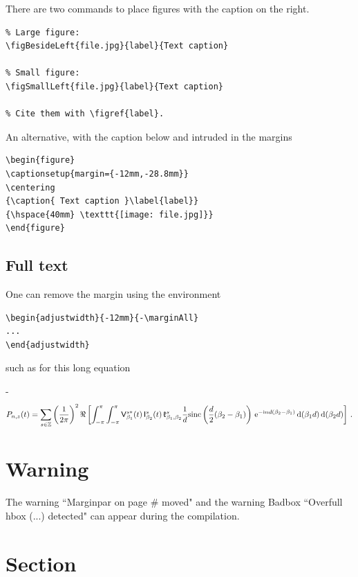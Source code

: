 There are two commands to place figures with the caption on the right.
\begin{verbatim}
% Large figure:
\figBesideLeft{file.jpg}{label}{Text caption}

% Small figure:
\figSmallLeft{file.jpg}{label}{Text caption}

% Cite them with \figref{label}.
\end{verbatim}
An alternative, with the caption below and intruded in the margins
\begin{verbatim}
\begin{figure}
\captionsetup{margin={-12mm,-28.8mm}}
\centering
{\caption{ Text caption }\label{label}}
{\hspace{40mm} \texttt{[image: file.jpg]}}
\end{figure}
\end{verbatim}

\subsection{Full text}

One can remove the margin using the environment
\begin{verbatim}
\begin{adjustwidth}{-12mm}{-\marginAll}
...
\end{adjustwidth}
\end{verbatim}
such as for this long equation
\begin{adjustwidth}{-12mm}{-\marginAll}
 \begin{equation}
  P_{n,z} (t) 
 = \sum_{s \in {\mathbb Z}} \left( \frac{1}{2 \pi}\right)^2 \Re \left[ \int_{- \pi}^\pi  \int_{- \pi}^\pi  {\mathsf V}^{s*}_{\beta_1}(t) \, {\mathsf I}^{s}_{\beta_2}(t) \, \mathfrak{k}^s_{\beta_1, \beta_2}   \frac{1}{d} \mathrm{sinc}\left( \frac{d}{2} ( \beta_2 - \beta_1 )\right) \, {\mathrm e}^{-{\mathrm i} n d( \beta_2 - \beta_1 )} \,  {\mathrm d} (\beta_1 d) \, {\mathrm d} (\beta_2 d) \right]  \, .
  \label{e.PnKinbeta}
\end{equation}
\end{adjustwidth}


\section{Warning}

The warning ``Marginpar on page \# moved" and the warning Badbox ``Overfull hbox (...) detected" can appear during the compilation.

\section{Section}

